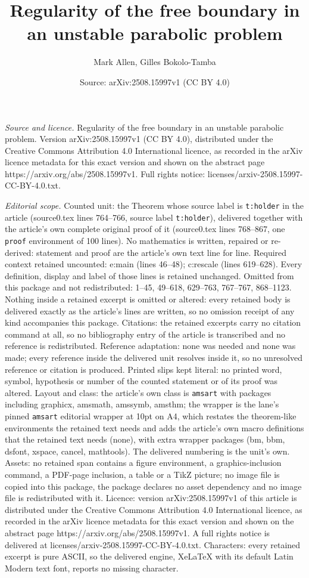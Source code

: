 \documentclass[10pt,a4paper]{amsart}
\title[Regularity of the free boundary in an unstable parabolic pro]{Regularity of the free boundary in an unstable parabolic problem}
\author{Mark Allen, Gilles Bokolo-Tamba}
\date{Source: arXiv:2508.15997v1 (CC BY 4.0)}
\begin{document}
\maketitle

\noindent\emph{Source and licence.} Regularity of the free boundary in an unstable parabolic problem. Version arXiv:2508.15997v1 (CC BY 4.0), distributed under the Creative Commons Attribution 4.0 International licence, as recorded in the arXiv licence metadata for this exact version and shown on the abstract page https://arxiv.org/abs/2508.15997v1. Full rights notice: licenses/arxiv-2508.15997-CC-BY-4.0.txt.\par\smallskip

\noindent\textit{Editorial scope.} Counted unit: the Theorem whose source label is \texttt{t:holder} in the article (source0.tex lines 764--766, source label \texttt{t:holder}), delivered together with the article's own complete original proof of it (source0.tex lines 768--867, one \texttt{proof} environment of 100 lines). No mathematics is written, repaired or re-derived: statement and proof are the article's own text line for line. Required context retained uncounted: e:main (lines 46--48); c:rescale (lines 619--628). Every definition, display and label of those lines is retained unchanged. Omitted from this package and not redistributed: 1--45, 49--618, 629--763, 767--767, 868--1123. Nothing inside a retained excerpt is omitted or altered: every retained body is delivered exactly as the article's lines are written, so no omission receipt of any kind accompanies this package. Citations: the retained excerpts carry no citation command at all, so no bibliography entry of the article is transcribed and no reference is redistributed. Reference adaptation: none was needed and none was made; every reference inside the delivered unit resolves inside it, so no unresolved reference or citation is produced. Printed slips kept literal: no printed word, symbol, hypothesis or number of the counted statement or of its proof was altered. Layout and class: the article's own class is \texttt{amsart} with packages including graphicx, amsmath, amssymb, amsthm; the wrapper is the lane's pinned \texttt{amsart} editorial wrapper at 10pt on A4, which restates the theorem-like environments the retained text needs and adds the article's own macro definitions that the retained text needs (none), with extra wrapper packages (bm, bbm, dsfont, xspace, cancel, mathtools). The delivered numbering is the unit's own. Assets: no retained span contains a figure environment, a graphics-inclusion command, a PDF-page inclusion, a table or a TikZ picture; no image file is copied into this package, the package declares no asset dependency and no image file is redistributed with it. Licence: version arXiv:2508.15997v1 of this article is distributed under the Creative Commons Attribution 4.0 International licence, as recorded in the arXiv licence metadata for this exact version and shown on the abstract page https://arxiv.org/abs/2508.15997v1. A full rights notice is delivered at licenses/arxiv-2508.15997-CC-BY-4.0.txt. Characters: every retained excerpt is pure ASCII, so the delivered engine, XeLaTeX with its default Latin Modern text font, reports no missing character.
\end{document}
